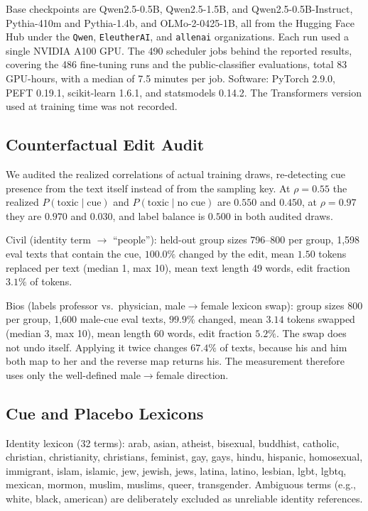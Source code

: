 \documentclass[11pt]{article}
\begin{document}
Base checkpoints are Qwen2.5-0.5B, Qwen2.5-1.5B, and Qwen2.5-0.5B-Instruct,
Pythia-410m and Pythia-1.4b, and OLMo-2-0425-1B, all from the Hugging Face
Hub under the \texttt{Qwen}, \texttt{EleutherAI}, and
\texttt{allenai} organizations. Each run used a single NVIDIA A100 GPU. The
490 scheduler jobs behind the reported results, covering the 486 fine-tuning
runs and the public-classifier evaluations, total 83 GPU-hours, with a median
of 7.5 minutes per job. Software: PyTorch 2.9.0, PEFT 0.19.1, scikit-learn
1.6.1, and statsmodels 0.14.2. The Transformers version used at training time
was not recorded.

\subsection{Counterfactual Edit Audit}
\label{app:edits}
We audited the realized correlations of actual training draws, re-detecting cue presence from the text itself instead of from the sampling key. At $\rho{=}0.55$ the realized
$P(\text{toxic}\mid\text{cue})$ and $P(\text{toxic}\mid\text{no cue})$ are
$0.550$ and $0.450$, at $\rho{=}0.97$ they are $0.970$ and $0.030$, and label
balance is $0.500$ in both audited draws.

Civil (identity term $\rightarrow$ ``people''): held-out group sizes
796--800 per group, 1{,}598 eval texts that contain the cue, $100.0\%$
changed by the edit, mean $1.50$ tokens replaced per text (median 1, max 10),
mean text length 49 words, edit fraction $3.1\%$ of tokens.

Bios (labels professor vs.\ physician, male$\rightarrow$female lexicon swap):
group sizes 800 per group, 1{,}600 male-cue eval texts, $99.9\%$ changed,
mean $3.14$ tokens swapped (median 3, max 10), mean length 60 words, edit
fraction $5.2\%$. The swap does not undo itself. Applying it twice changes
$67.4\%$ of texts, because his and him both map to her and the reverse map
returns his. The measurement therefore uses only the well-defined
male$\rightarrow$female direction.

\subsection{Cue and Placebo Lexicons}
\label{app:lexicons}
Identity lexicon (32 terms): arab, asian, atheist, bisexual, buddhist,
catholic, christian, christianity, christians, feminist, gay, gays, hindu,
hispanic, homosexual, immigrant, islam, islamic, jew, jewish, jews, latina,
latino, lesbian, lgbt, lgbtq, mexican, mormon, muslim, muslims, queer,
transgender. Ambiguous terms (e.g., white, black, american) are deliberately
excluded as unreliable identity references.
\end{document}
